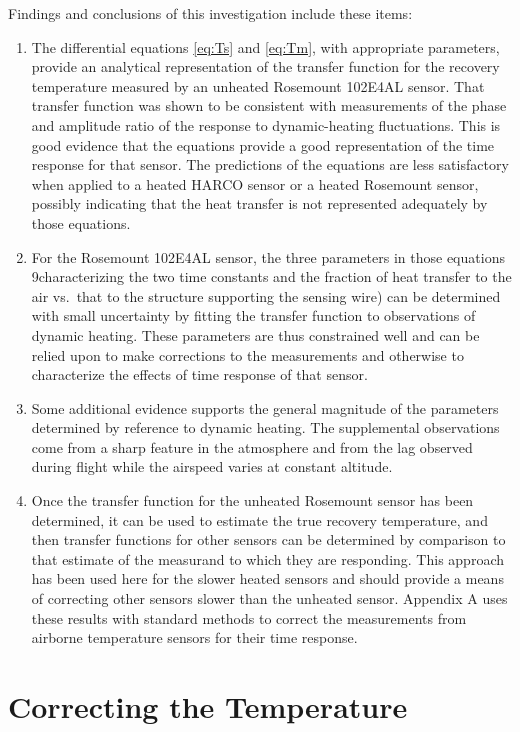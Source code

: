 \documentclass[11pt,twoside,american,12pt,twoside,american]{article}\usepackage[]{graphicx}\usepackage[]{color}
\let\stdsection\section
\renewcommand{\section}{\newpage\stdsection}
\begin{document}
Findings and conclusions of this investigation include these items:
\begin{enumerate}
\item The differential equations \eqref{eq:Ts} and \eqref{eq:Tm}, with
appropriate parameters, provide an analytical representation of the
transfer function for the recovery temperature measured by an unheated
Rosemount 102E4AL sensor. That transfer function was shown to be consistent
with measurements of the phase and amplitude ratio of the response
to dynamic-heating fluctuations. This is good evidence that the equations
provide a good representation of the time response for that sensor.
The predictions of the equations are less satisfactory when applied
to a heated HARCO sensor or a heated Rosemount sensor, possibly indicating
that the heat transfer is not represented adequately by those equations.
\item For the Rosemount 102E4AL sensor, the three parameters in those equations
9characterizing the two time constants and the fraction of heat transfer
to the air vs.~that to the structure supporting the sensing wire)
can be determined with small uncertainty by fitting the transfer function
to observations of dynamic heating. These parameters are thus constrained
well and can be relied upon to make corrections to the measurements
and otherwise to characterize the effects of time response of that
sensor.
\item Some additional evidence supports the general magnitude of the parameters
determined by reference to dynamic heating. The supplemental observations
come from a sharp feature in the atmosphere and from the lag observed
during flight while the airspeed varies at constant altitude.
\item Once the transfer function for the unheated Rosemount sensor has been
determined, it can be used to estimate the true recovery temperature,
and then transfer functions for other sensors can be determined by
comparison to that estimate of the measurand to which they are responding.
This approach has been used here for the slower heated sensors and
should provide a means of correcting other sensors slower than the
unheated sensor. Appendix A uses these results with standard methods
to correct the measurements from airborne temperature sensors for
their time response.
\end{enumerate}

\appendix

\section{Correcting the Temperature\label{sec:Correcting-the-Temperature}}
\end{document}
